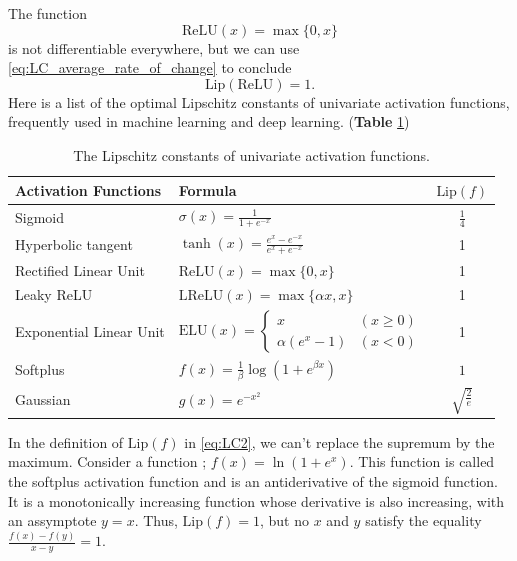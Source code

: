 \documentclass[12pt]{report}
\numberwithin{figure}{chapter}
\theoremstyle{plain}
\theoremstyle{definition}
\theoremstyle{corollary}
\theoremstyle{definition}
\theoremstyle{plain}
\theoremstyle{definition}
\theoremstyle{plain}
\newcommand\lip{\ensuremath{\text{Lip}}}
\begin{document}
The  function
\begin{equation}\label{eq:ReLU}
\text{ReLU}(x)=\max\{0,x\}
\end{equation}
 is not differentiable everywhere, but we can use \eqref{eq:LC_average_rate_of_change} to conclude
\begin{equation}\label{eq:ReLU_LC}
\lip(\text{ReLU})=1.
\end{equation}
Here is a list of the optimal Lipschitz constants of univariate activation functions, frequently used in machine learning and deep learning. (\textbf{Table} \ref{tab:univariate_activation_functions})
 
\renewcommand\arraystretch{1.5}
\begin{table}[ht]
\centering
\caption{The Lipschitz constants of univariate activation functions.}
\label{tab:univariate_activation_functions}
\begin{tabular}[t]{llc}
\toprule
Activation Functions	&Formula									& $\lip(f)$\\
\midrule
Sigmoid				&$\sigma(x)=\frac1{1+e^{-x}}$				&$\frac14$\\
Hyperbolic tangent	&$\tanh(x)=\frac{e^x-e^{-x}}{e^x+e^{-x}}$	&1\\
Rectified Linear Unit	&$\text{ReLU}(x)=\max\{0,x\}$			&1\\
Leaky ReLU			&$\text{LReLU}(x)=\max\{\alpha x,x\}$	&1\\
Exponential Linear Unit&$\text{ELU}(x)=
\begin{cases}x&(x\ge0)\\\alpha(e^x-1)&(x<0)\end{cases}$	&1\\
Softplus			&$f(x)=\frac1\beta\log(1+e^{\beta x})$	&$1$\\
Gaussian			&$g(x)=e^{-x^2}$								&$\sqrt{\frac2e}$\\
\bottomrule
\end{tabular}
\end{table}

In the definition of \(\lip(f)\) in \eqref{eq:LC2}, we can't replace the supremum by the maximum.
Consider a function ; \(f(x)=\ln(1+e^x)\).
This function is called the softplus activation function and is an antiderivative of the sigmoid function.
It is a monotonically increasing function whose derivative is also increasing, with an assymptote \(y=x\).
Thus, \(\lip(f)=1\), but no \(x\) and \(y\) satisfy the equality \(\frac{f(x)-f(y)}{x-y}=1\).
\end{document}

